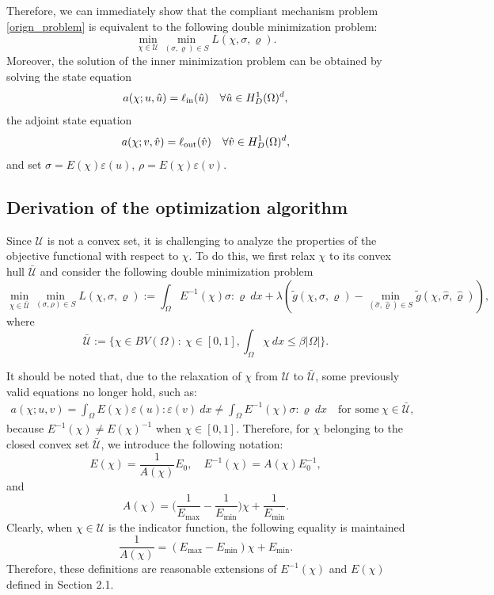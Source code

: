 \documentclass{amsart}
\begin{document}
Therefore, we can immediately show that the compliant mechanism problem \eqref{orign_problem} is equivalent to the following double minimization problem:
\begin{equation}
    \min_{\chi\in\mathcal{U}}\min_{(\sigma,\varrho)\in S}L(\chi,\sigma,\varrho).
\end{equation}
Moreover, the solution of the inner minimization problem can be obtained by solving the state equation
\begin{equation}
    a(\chi;u,\hat{u})=\ell_{\rm in}(\hat{u})\quad\forall\hat{u}\in H_D^1(\Omega)^d,
\end{equation}
the adjoint state equation
\begin{equation}
    a(\chi;v,\hat{v})=\ell_{\rm out}(\hat{v})\quad\forall\hat{v}\in H_D^1(\Omega)^d,
\end{equation}
and set \(\sigma = E(\chi)\varepsilon(u)\), \(\rho = E(\chi)\varepsilon(v)\).

\subsection{Derivation of the optimization algorithm}
Since $\mathcal{U}$ is not a convex set, it is challenging to analyze the properties of the objective functional with respect to \(\chi\). To do this, we first relax $ \chi $ to its convex hull $\bar{\mathcal{U}}$ and consider the following double minimization problem
\begin{equation}
    \min\limits_{\chi\in \bar{\mathcal{U}}}\min\limits_{(\sigma,\rho)\in S}L(\chi,\sigma,\varrho):=\int_{\Omega}E^{-1}(\chi)\sigma:\varrho\ dx + \lambda\left( \tilde{g}(\chi,\sigma,\varrho)-\min_{(\hat{\sigma},\hat{\varrho})\in S} \tilde{g}(\chi,\hat{\sigma},\hat{\varrho})\right),
\end{equation}
where $$ \bar{\mathcal{U}}:=\Big\{\chi\in BV(\Omega):\ \chi\in [0,1],\int_{\Omega}\chi\ dx \leq\beta|\Omega|\Big\}.$$ 

It should be noted that, due to the relaxation of $ \chi$ from $\mathcal{U}$ to $ \bar{\mathcal{U}} $, some previously valid equations no longer hold, such as:
\begin{align}
    a(\chi;u,v)=\int_{\Omega}E(\chi)\varepsilon(u):\varepsilon(v)\ dx\neq\int_{\Omega}E^{-1}(\chi)\sigma:\varrho\ dx\quad\mbox{for\ some}\  \chi\in\bar{\mathcal{U}},
\end{align}
because $E^{-1}(\chi)\neq E(\chi)^{-1}$ when $\chi\in [0,1]$. Therefore, for $ \chi $ belonging to the closed convex set $\bar{\mathcal{U}}$, we introduce the following notation: 
\begin{equation}
    E(\chi)=\dfrac{1}{A(\chi)}{E}_0,\quad E^{-1}(\chi)=A(\chi){E}_0^{-1},
\end{equation}
 and
$$ A(\chi)=\Big(\dfrac{1}{E_{\max}}-\dfrac{1}{E_{\min}}\Big)\chi+\dfrac{1}{E_{\min}} .$$
Clearly, when $ \chi \in \mathcal{U} $ is the indicator function, the following equality is maintained
$$\dfrac{1}{A(\chi)} = (E_{\max}-E_{\min})\chi + E_{\min}.$$
Therefore, these definitions are reasonable extensions of $ E^{-1}(\chi) $ and $ E(\chi) $ defined in Section 2.1.
\end{document}
